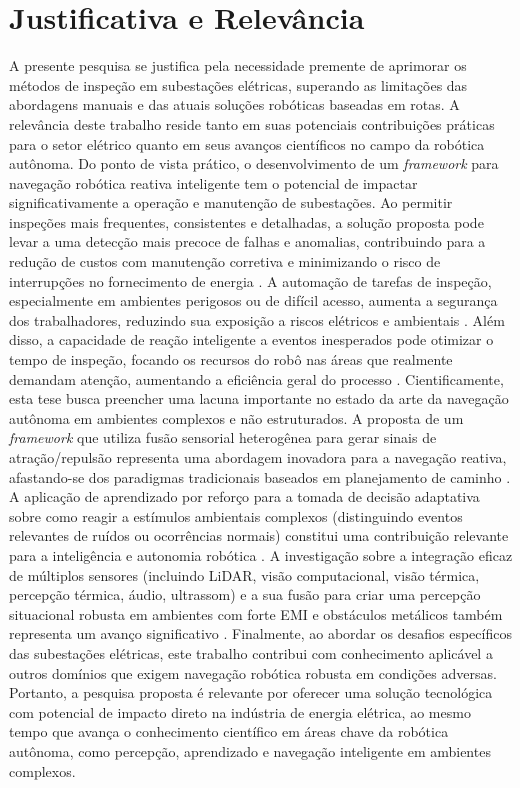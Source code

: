 \section{Justificativa e Relevância}
A presente pesquisa se justifica pela necessidade premente de aprimorar os métodos de inspeção em subestações elétricas, superando as limitações das abordagens manuais e das atuais soluções robóticas baseadas em rotas. A relevância deste trabalho reside tanto em suas potenciais contribuições práticas para o setor elétrico quanto em seus avanços científicos no campo da robótica autônoma.
Do ponto de vista prático, o desenvolvimento de um \textit{framework} para navegação robótica reativa inteligente tem o potencial de impactar significativamente a operação e manutenção de subestações. Ao permitir inspeções mais frequentes, consistentes e detalhadas, a solução proposta pode levar a uma detecção mais precoce de falhas e anomalias, contribuindo para a redução de custos com manutenção corretiva e minimizando o risco de interrupções no fornecimento de energia \cite{Wang2024Advancements, AtlantisPress2023Analysis}. A automação de tarefas de inspeção, especialmente em ambientes perigosos ou de difícil acesso, aumenta a segurança dos trabalhadores, reduzindo sua exposição a riscos elétricos e ambientais \cite{Anybotics2023Advantages}. Além disso, a capacidade de reação inteligente a eventos inesperados pode otimizar o tempo de inspeção, focando os recursos do robô nas áreas que realmente demandam atenção, aumentando a eficiência geral do processo \cite{EnergyRobotics2024Future}.
Cientificamente, esta tese busca preencher uma lacuna importante no estado da arte da navegação autônoma em ambientes complexos e não estruturados. A proposta de um \textit{framework} que utiliza fusão sensorial heterogênea para gerar sinais de atração/repulsão representa uma abordagem inovadora para a navegação reativa, afastando-se dos paradigmas tradicionais baseados em planejamento de caminho \cite{Hou2023ChallengesSolutions}. A aplicação de aprendizado por reforço para a tomada de decisão adaptativa sobre como reagir a estímulos ambientais complexos (distinguindo eventos relevantes de ruídos ou ocorrências normais) constitui uma contribuição relevante para a inteligência e autonomia robótica \cite{Tai2024AutonomousRL, Kim2023MultimodalFusion}. A investigação sobre a integração eficaz de múltiplos sensores (incluindo \ac{LiDAR}, visão computacional, visão térmica, percepção térmica, áudio, ultrassom) e a sua fusão para criar uma percepção situacional robusta em ambientes com forte \ac{EMI} e obstáculos metálicos também representa um avanço significativo \cite{Hussain2020ReviewChallenges, Kim2024AutonomousNavSensorFusion}. Finalmente, ao abordar os desafios específicos das subestações elétricas, este trabalho contribui com conhecimento aplicável a outros domínios que exigem navegação robótica robusta em condições adversas.
Portanto, a pesquisa proposta é relevante por oferecer uma solução tecnológica com potencial de impacto direto na indústria de energia elétrica, ao mesmo tempo que avança o conhecimento científico em áreas chave da robótica autônoma, como percepção, aprendizado e navegação inteligente em ambientes complexos.

